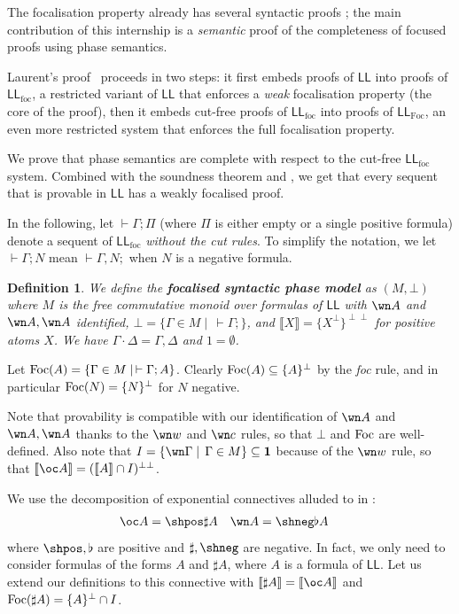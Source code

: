 \documentclass[11pt]{article}
\newtheorem{definition}{Definition}[section]
\newcommand\LL{\textsf{LL}}
\newcommand\0{\textbf{0}}
\newcommand\1{\textbf{1}}
\newcommand\LLfoc{{\LL_\text{foc}}}
\newcommand\LLFoc{{\LL_\text{Foc}}}
\newcommand\sem[1]{{\llbracket #1 \rrbracket}}
\newcommand\biperp{{\perp\perp}}
\newcommand\Foc{\textup{Foc}}
\begin{document}
The focalisation property already has several syntactic proofs \cite{andreoli} \cite{saurin} \cite{laurent}; the main
contribution of this internship is a \emph{semantic} proof of the completeness of focused proofs
using phase semantics.

Laurent's proof~\cite{laurent} proceeds in two steps: it first embeds proofs of $\LL$ into proofs of $\LLfoc$, a
restricted variant of $\LL$ that enforces a \emph{weak} focalisation property (the core of the proof),
then it embeds cut-free proofs of $\LLfoc$ into proofs of $\LLFoc$, an even more restricted system that enforces
the full focalisation property.

We prove that phase semantics are complete with respect to the cut-free $\LLfoc$ system. Combined with the soundness theorem
and \cite[proposition 1]{laurent}, we get that every sequent that is provable in $\LL$ has a weakly focalised proof.

In the following, let $\vdash \Gamma; \Pi$ (where $\Pi$ is either empty or a single positive formula) denote a sequent
of $\LLfoc$ \emph{without the cut rules}.
To simplify the notation, we let $\vdash \Gamma; N$ mean $\vdash \Gamma, N;$ when $N$ is a negative formula.

\begin{definition}
We define the \textbf{focalised syntactic phase model} as $(M, \bot)$ where $M$ is the
free commutative monoid over formulas of $\LL$ with $\wn A$ and $\wn A, \wn A$ identified,
$\bot = \{\Gamma \in M \mid\,\vdash \Gamma;\}$, and
$\sem{X} = \{X^\perp\}^\biperp$ for positive atoms $X$. We have $\Gamma \cdot \Delta = \Gamma, \Delta$ and $1 = \emptyset$.
\end{definition}

Let $\Foc(A) = {\{\Gamma \in M \mid\, \vdash \Gamma; A\}}$.
Clearly $\Foc(A) \subseteq \{A\}^\perp$ by the \textit{foc} rule, and in particular
$\Foc(N) = \{N\}^\perp$ for $N$ negative.

Note that provability is compatible with our identification of $\wn A$ and $\wn A, \wn A$ thanks to the $\wn w$ and $\wn c$ rules,
so that $\bot$ and $\Foc$ are well-defined. Also note that $I = \{\wn \Gamma\mid\,\Gamma\in M\} \subseteq \1$ because of the
$\wn w$ rule, so that $\sem{\oc A} = (\sem{A} \cap I)^\biperp$.

We use the decomposition of exponential connectives alluded to in \cite[section 4.1]{laurent}: \begin{align*}
    \oc A &= \shpos\sharp A & \wn A &= \shneg\flat A
\end{align*}
where $\shpos, \flat$ are positive and $\sharp, \shneg$ are negative.
In fact, we only need to consider formulas of the forms $A$ and $\sharp A$, where $A$ is a formula of $\LL$.
Let us extend our definitions to this connective
with $\sem{\sharp A} = \sem{\oc A}$ and $\Foc(\sharp A) = \{A\}^\perp \cap I$.
\end{document}
